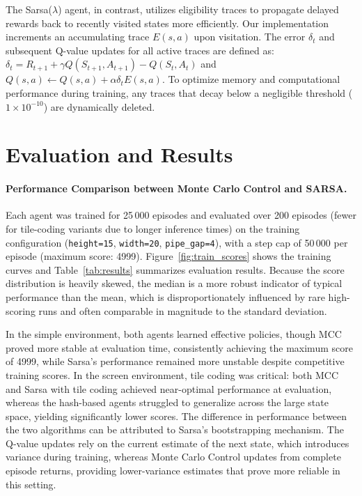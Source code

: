 \documentclass[runningheads]{llncs}
\begin{document}
The Sarsa($\lambda$) agent, in contrast, utilizes eligibility traces to propagate delayed rewards back to recently visited states more efficiently\cite{sutton2018reinforcement}. Our implementation increments an accumulating trace $E(s,a)$ upon visitation. The error $\delta_t$ and subsequent Q-value updates for all active traces are defined as:
$\delta_t = R_{t+1} + \gamma Q(S_{t+1}, A_{t+1}) - Q(S_t, A_t)$ and
$Q(s, a) \leftarrow Q(s, a) + \alpha \delta_t E(s, a)$.
To optimize memory and computational performance during training, any traces that decay below a negligible threshold ($1 \times 10^{-10}$) are dynamically deleted.


\section{Evaluation and Results}
\paragraph{Performance Comparison between Monte Carlo Control and SARSA.} Each agent
was trained for 25\,000 episodes and evaluated over 200 episodes (fewer for tile-coding
variants due to longer inference times) on the training configuration (\texttt{height=15},
\texttt{width=20}, \texttt{pipe\_gap=4}), with a step cap of 50\,000 per episode
(maximum score: 4999). Figure~\ref{fig:train_scores} shows the training curves and
Table~\ref{tab:results} summarizes evaluation results. Because the score distribution
is heavily skewed, the median is a more robust indicator of typical performance than
the mean, which is disproportionately influenced by rare high-scoring runs and often
comparable in magnitude to the standard deviation.

In the simple environment, both agents learned effective policies, though MCC proved
more stable at evaluation time, consistently achieving the maximum score of 4999, while
Sarsa's performance remained more unstable despite competitive training scores. In the
screen environment, tile coding was critical: both MCC and Sarsa with tile coding
achieved near-optimal performance at evaluation, whereas the hash-based agents
struggled to generalize across the large state space, yielding significantly lower
scores. The difference in performance between the two algorithms can be attributed to Sarsa's bootstrapping mechanism. The Q-value updates rely on the current estimate of the next state, which introduces variance during training, whereas Monte Carlo Control updates from complete episode returns, providing lower-variance estimates that prove more reliable in this setting.
\end{document}
